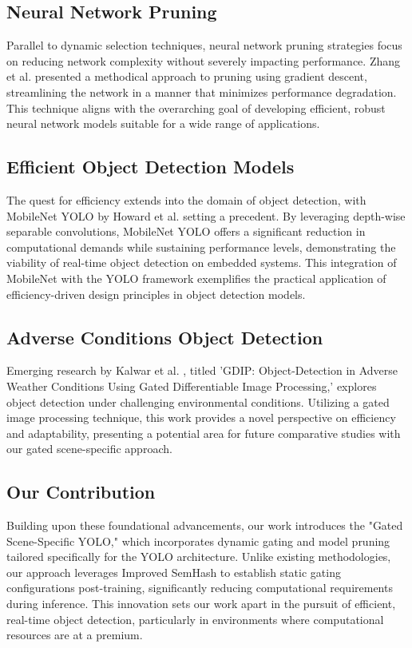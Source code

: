 \subsection{Neural Network Pruning}

Parallel to dynamic selection techniques, neural network pruning strategies focus on reducing network complexity without severely impacting performance. Zhang et al. \cite{zhang2023neural} presented a methodical approach to pruning using gradient descent, streamlining the network in a manner that minimizes performance degradation. This technique aligns with the overarching goal of developing efficient, robust neural network models suitable for a wide range of applications.

\subsection{Efficient Object Detection Models}

The quest for efficiency extends into the domain of object detection, with MobileNet YOLO by Howard et al. \cite{howard2019searching} setting a precedent. By leveraging depth-wise separable convolutions, MobileNet YOLO offers a significant reduction in computational demands while sustaining performance levels, demonstrating the viability of real-time object detection on embedded systems. This integration of MobileNet with the YOLO framework exemplifies the practical application of efficiency-driven design principles in object detection models.

\subsection{Adverse Conditions Object Detection}

Emerging research by Kalwar et al. \cite{kalwar2023gdip}, titled 'GDIP: Object-Detection in Adverse Weather Conditions Using Gated Differentiable Image Processing,' explores object detection under challenging environmental conditions. Utilizing a gated image processing technique, this work provides a novel perspective on efficiency and adaptability, presenting a potential area for future comparative studies with our gated scene-specific approach.

\subsection{Our Contribution}

Building upon these foundational advancements, our work introduces the "Gated Scene-Specific YOLO," which incorporates dynamic gating and model pruning tailored specifically for the YOLO architecture. Unlike existing methodologies, our approach leverages Improved SemHash to establish static gating configurations post-training, significantly reducing computational requirements during inference. This innovation sets our work apart in the pursuit of efficient, real-time object detection, particularly in environments where computational resources are at a premium.


\clearpage
